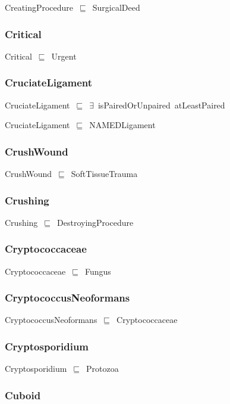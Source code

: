 \documentclass{article}
\begin{document}
CreatingProcedure~\ensuremath{\sqsubseteq}~SurgicalDeed~

\subsubsection*{Critical}

Critical~\ensuremath{\sqsubseteq}~Urgent~

\subsubsection*{CruciateLigament}

CruciateLigament~\ensuremath{\sqsubseteq}~\ensuremath{\exists}~isPairedOrUnpaired~atLeastPaired~

CruciateLigament~\ensuremath{\sqsubseteq}~NAMEDLigament~

\subsubsection*{CrushWound}

CrushWound~\ensuremath{\sqsubseteq}~SoftTissueTrauma~

\subsubsection*{Crushing}

Crushing~\ensuremath{\sqsubseteq}~DestroyingProcedure~

\subsubsection*{Cryptococcaceae}

Cryptococcaceae~\ensuremath{\sqsubseteq}~Fungus~

\subsubsection*{CryptococcusNeoformans}

CryptococcusNeoformans~\ensuremath{\sqsubseteq}~Cryptococcaceae~

\subsubsection*{Cryptosporidium}

Cryptosporidium~\ensuremath{\sqsubseteq}~Protozoa~

\subsubsection*{Cuboid}
\end{document}
